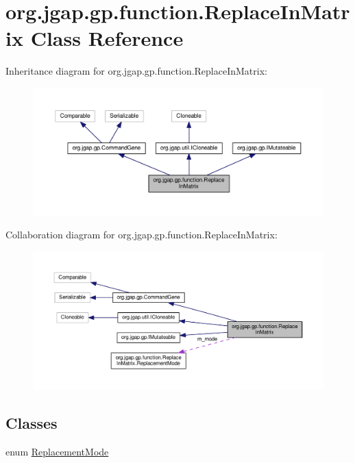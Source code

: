 \hypertarget{classorg_1_1jgap_1_1gp_1_1function_1_1_replace_in_matrix}{\section{org.\-jgap.\-gp.\-function.\-Replace\-In\-Matrix Class Reference}
\label{classorg_1_1jgap_1_1gp_1_1function_1_1_replace_in_matrix}
}


Inheritance diagram for org.\-jgap.\-gp.\-function.\-Replace\-In\-Matrix\-:
\nopagebreak
\begin{figure}[H]
\begin{center}
\leavevmode
\includegraphics[width=350pt]{classorg_1_1jgap_1_1gp_1_1function_1_1_replace_in_matrix__inherit__graph}
\end{center}
\end{figure}


Collaboration diagram for org.\-jgap.\-gp.\-function.\-Replace\-In\-Matrix\-:
\nopagebreak
\begin{figure}[H]
\begin{center}
\leavevmode
\includegraphics[width=350pt]{classorg_1_1jgap_1_1gp_1_1function_1_1_replace_in_matrix__coll__graph}
\end{center}
\end{figure}
\subsection*{Classes}
\begin{DoxyCompactItemize}
\item 
enum \hyperlink{enumorg_1_1jgap_1_1gp_1_1function_1_1_replace_in_matrix_1_1_replacement_mode}{Replacement\-Mode}
\end{DoxyCompactItemize}
